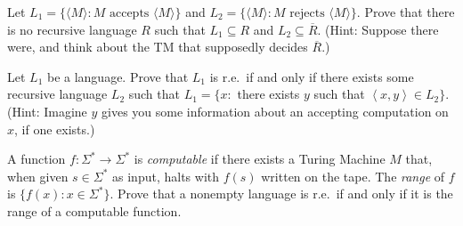 \documentclass[ps, letterpaper]{cs121}
\begin{document}

\newcommand{\<}{\langle}
\renewcommand{\>}{\rangle}

Let $L_1 = \{\langle M \rangle : M  \mbox{ accepts } \langle M \rangle\}$ and
$L_2 = \{\langle M \rangle: M \mbox{ rejects } \langle M \rangle \}$. Prove that there is no recursive language $R$ such that $L_1 \subseteq R$ and $L_2 \subseteq \overline{R}$. (Hint: Suppose there were, and think about the TM that supposedly decides $\overline{R}$.)


Let $L_1$ be a language. Prove that $L_1$ is r.e.~if and only if there exists some recursive language $L_2$ such that $L_1 =\{x:$ there exists $y$ such that $\left<x,y\right> \in L_2 \}$. (Hint: Imagine $y$ gives you some information about an accepting computation on $x$, if one exists.)


\vspace{-6pt}
A function $f:\Sigma^* \rightarrow \Sigma^*$ is {\it computable} if
there exists a Turing Machine $M$ that, when given $s \in \Sigma^*$ as input,
halts with $f(s)$ written on the tape. The \emph{range} of $f$ is $\{f(x):
  x \in \Sigma^*\}$. Prove that a nonempty language is r.e.~if and only if 
  it is the range of a computable function. 
 \vspace{-6pt}

\end{document}
